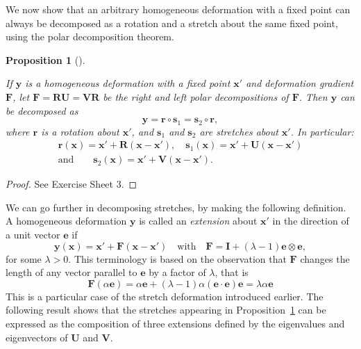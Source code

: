 \documentclass[
  letterpaper,
  DIV=11,
  numbers=noendperiod]{scrreprt}
\theoremstyle{plain}
\newtheorem{proposition}{Proposition}[chapter]
\theoremstyle{remark}
\begin{document}
We now show that an arbitrary homogeneous deformation with a fixed point
can always be decomposed as a rotation and a stretch about the same
fixed point, using the polar decomposition theorem.

\begin{proposition}[]\protect\hypertarget{prp-stretchdecomposition}{}\label{prp-stretchdecomposition}

If \({\boldsymbol{y}}\) is a homogeneous deformation with a fixed point
\({\boldsymbol{x}}'\) and deformation gradient \({\boldsymbol{F}}\), let
\({\boldsymbol{F}}= {\boldsymbol{R}}{\boldsymbol{U}}={\boldsymbol{V}}{\boldsymbol{R}}\)
be the right and left polar decompositions of \({\boldsymbol{F}}\). Then
\({\boldsymbol{y}}\) can be decomposed as
\[{\boldsymbol{y}}= {\boldsymbol{r}}\circ {\boldsymbol{s}}_1={\boldsymbol{s}}_2\circ{\boldsymbol{r}},\]
where \({\boldsymbol{r}}\) is a rotation about \({\boldsymbol{x}}'\),
and \({\boldsymbol{s}}_1\) and \({\boldsymbol{s}}_2\) are stretches
about \({\boldsymbol{x}}'\). In particular: \[\begin{gathered}
    {\boldsymbol{r}}({\boldsymbol{x}}) = {\boldsymbol{x}}'+{\boldsymbol{R}}({\boldsymbol{x}}-{\boldsymbol{x}}'),\quad{\boldsymbol{s}}_1({\boldsymbol{x}}) = {\boldsymbol{x}}'+{\boldsymbol{U}}({\boldsymbol{x}}-{\boldsymbol{x}}')\\
    \text{and}\quad\quad{\boldsymbol{s}}_2({\boldsymbol{x}}) = {\boldsymbol{x}}'+{\boldsymbol{V}}({\boldsymbol{x}}-{\boldsymbol{x}}').
  \end{gathered}\]

\end{proposition}

\begin{proof}
See Exercise Sheet 3.
\end{proof}

We can go further in decomposing stretches, by making the following
definition. A homogeneous deformation \({\boldsymbol{y}}\) is called an
\emph{extension} about \({\boldsymbol{x}}'\) in the direction of a unit
vector \({\boldsymbol{e}}\) if
\[{\boldsymbol{y}}({\boldsymbol{x}}) = {\boldsymbol{x}}'+{\boldsymbol{F}}({\boldsymbol{x}}-{\boldsymbol{x}}')\quad\text{with}\quad {\boldsymbol{F}}={\boldsymbol{I}}+(\lambda-1){\boldsymbol{e}}\otimes{\boldsymbol{e}},\]
for some \(\lambda>0\). This terminology is based on the observation
that \({\boldsymbol{F}}\) changes the length of any vector parallel to
\({\boldsymbol{e}}\) by a factor of \(\lambda\), that is
\[{\boldsymbol{F}}(\alpha{\boldsymbol{e}}) = \alpha{\boldsymbol{e}}+(\lambda-1)\alpha({\boldsymbol{e}}\cdot{\boldsymbol{e}}){\boldsymbol{e}}= \lambda\alpha{\boldsymbol{e}}\]
This is a particular case of the stretch deformation introduced earlier.
The following result shows that the stretches appearing in
Proposition~\ref{prp-stretchdecomposition} can be expressed as the
composition of three extensions defined by the eigenvalues and
eigenvectors of \({\boldsymbol{U}}\) and \({\boldsymbol{V}}\).
\end{document}
